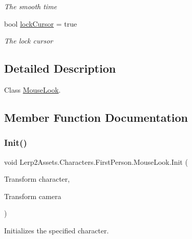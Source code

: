 \begin{DoxyCompactItemize}
\begin{DoxyCompactList}\small\item\em The smooth time \end{DoxyCompactList}\item 
bool \hyperlink{class_lerp2_assets_1_1_characters_1_1_first_person_1_1_mouse_look_adae7e643b933035c3aed07019908a4ca}{lock\+Cursor} = true
\begin{DoxyCompactList}\small\item\em The lock cursor \end{DoxyCompactList}\end{DoxyCompactItemize}


\subsection{Detailed Description}
Class \hyperlink{class_lerp2_assets_1_1_characters_1_1_first_person_1_1_mouse_look}{Mouse\+Look}. 



\subsection{Member Function Documentation}
\mbox{\label{class_lerp2_assets_1_1_characters_1_1_first_person_1_1_mouse_look_ae2ecd201284cf4f8496b43f9a26df3ca}} 
\subsubsection{\texorpdfstring{Init()}{Init()}}
{\footnotesize\ttfamily void Lerp2\+Assets.\+Characters.\+First\+Person.\+Mouse\+Look.\+Init (\begin{DoxyParamCaption}\item[{Transform}]{character,  }\item[{Transform}]{camera }\end{DoxyParamCaption})\hspace{0.3cm}{\ttfamily [inline]}}



Initializes the specified character. 


